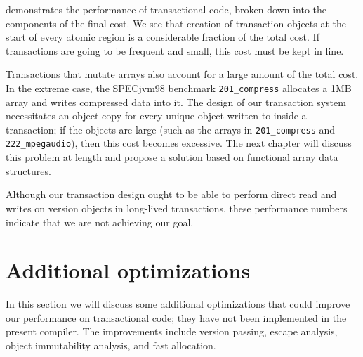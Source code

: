  demonstrates the performance of transactional
code, broken down into the components of the final cost.  We see that
creation of transaction objects at the start of every atomic region is
a considerable fraction of the total cost.  If transactions are going
to be frequent and small, this cost must be kept in line.

Transactions that mutate arrays also account for a large amount of
the total cost.  In the extreme case, the SPECjvm98 benchmark
\texttt{201\_compress} allocates a 1MB array and writes compressed
data into it.  The design of our transaction system necessitates an
object copy for every unique object written to inside a transaction;
if the objects are large (such as the arrays in
\texttt{201\_compress} and \texttt{222\_mpegaudio}), then this cost
becomes excessive.  The next chapter will discuss this problem at
length and propose a solution based on functional array data
structures.

Although our transaction design ought to be able to perform direct
read and writes on version objects in long-lived transactions, these
performance numbers indicate that we are not achieving our goal.


\section{Additional optimizations}\label{sec:moreopt}

In this section we will discuss some additional optimizations
that could improve our performance on transactional code; they have
not been implemented in the present compiler.  The improvements
include version passing, escape analysis, object immutability
analysis, and fast allocation.

